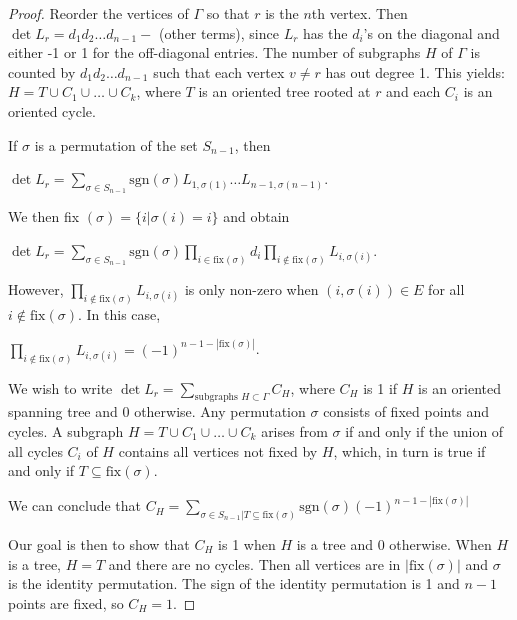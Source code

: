 \documentclass[11pt]{article}
\theoremstyle{definition}
\begin{document}
	\begin{proof}
		Reorder the vertices of $\Gamma$ so that $r$ is the $n$th vertex. 
		Then $\det L_r = d_1d_2 \dots d_{n-1} -$ (other terms), since $L_r$ has the $d_i$'s on the diagonal and either -1 or 1 for the off-diagonal entries. 
		The number of subgraphs $H$ of $\Gamma$ is counted by $d_1d_2 \dots d_{n-1}$ such that each vertex $v \neq r$ has out degree 1. 
		This yields: $H = T \cup C_1 \cup \dots \cup C_k$, where $T$ is an oriented tree rooted at $r$ and each $C_i$ is an oriented cycle. 
		
		If $\sigma$ is a permutation of the set $S_{n-1}$, then 
		\begin{center}
			$\det L_r = \sum_{\sigma \in S_{n-1}} \text{sgn} (\sigma)L_{1, \sigma(1)} \dots L_{n-1, \sigma(n-1)}$.
		\end{center}
		
		We then fix $(\sigma) = \{i | \sigma(i) = i\}$ and obtain 
		\begin{center}
			$\det L_r = \sum_{\sigma \in S_{n-1}} \text{sgn}(\sigma) \prod_{i \in \text{fix}(\sigma)} d_i \prod_{i \not \in \text{fix}(\sigma)} L_{i, \sigma(i)}$.
		\end{center}
		However, $\prod_{i \not \in \text{fix}(\sigma)} L_{i, \sigma(i)}$ is only non-zero when $(i,\sigma(i)) \in E$ for all $i \not \in \text{fix}(\sigma)$.
		In this case, 
			\begin{center}
				$\prod_{i \not \in \text{fix}(\sigma)} L_{i, \sigma(i)} = (-1)^{n -1 - | \text{fix}(\sigma)|}$.
			\end{center}
		We wish to write $\det L_r = \sum_{\text{subgraphs } H \subset \Gamma} C_H$, where $C_H$ is 1 if $H$ is an oriented spanning tree and 0 otherwise.
		Any permutation $\sigma$ consists of fixed points and cycles. A subgraph $H = T \cup C_1 \cup \dots \cup C_k$ arises from $\sigma$ if and only if the union of all cycles $C_i$ of $H$ contains all vertices not fixed by $H$, which, in turn is true if and only if $T \subseteq \text{fix}(\sigma)$.
		
		We can conclude that $ C_H = \sum_{\sigma \in S_{n-1} | T \subseteq \text{fix}(\sigma)} \text{sgn}(\sigma)(-1)^{n -1 - | \text{fix}(\sigma)|}$
		
		Our goal is then to show that $C_H$ is 1 when $H$ is a tree and 0 otherwise. When $H$ is a tree, $H = T$ and there are no cycles. Then all vertices are in $|\text{fix}(\sigma)|$ and $\sigma$ is the identity permutation.
		The sign of the identity permutation is 1 and $n-1$ points are fixed, so $C_H = 1$.
		

\end{proof}
\end{document}
